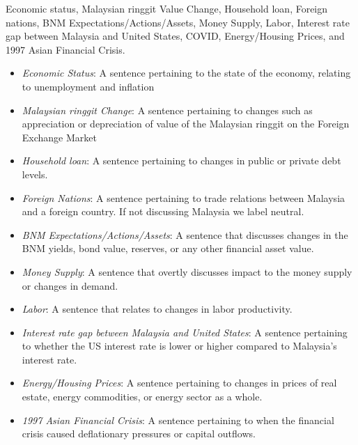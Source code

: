  Economic status, Malaysian ringgit Value Change, Household loan, Foreign nations, BNM Expectations/Actions/Assets, Money Supply, Labor, Interest rate gap between Malaysia and United States, COVID, Energy/Housing Prices, and 1997 Asian Financial Crisis.

\begin{itemize}
    \item \emph{Economic Status}: A sentence pertaining to the state of the economy, relating to unemployment and inflation
    \item \emph{Malaysian ringgit Change}: A sentence pertaining to changes such as appreciation or depreciation of value of the Malaysian ringgit on the Foreign Exchange Market
    \item \emph{Household loan}: A sentence pertaining to changes in public or private debt levels.
    \item \emph{Foreign Nations}: A sentence pertaining to trade relations between Malaysia and a foreign country. If not discussing Malaysia we label neutral.
    \item \emph{BNM Expectations/Actions/Assets}: A sentence that discusses changes in the BNM yields, bond value, reserves, or any other financial asset value.
    \item \emph{Money Supply}: A sentence that overtly discusses impact to the money supply or changes in demand.
    \item \emph{Labor}: A sentence that relates to changes in labor productivity.
    \item \emph{Interest rate gap between Malaysia and United States}: A sentence pertaining to whether the US interest rate is lower or higher compared to Malaysia's interest rate.
    \item \emph{Energy/Housing Prices}: A sentence pertaining to changes in prices of real estate, energy commodities, or energy sector as a whole.
    \item \emph{1997 Asian Financial Crisis}: A sentence pertaining to when the financial crisis caused deflationary pressures or capital outflows.
\end{itemize}

